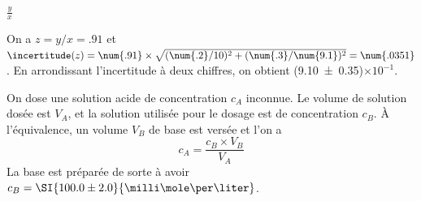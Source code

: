 

\begin{enonce}
$\frac{y}{x}$
\end{enonce}


\begin{corrige}
On a $z=y/x=\num{.91}$ et $\incertitude(z)=\num{.91}\times \sqrt{(\num{.2}/10)^2+(\num{.3}/\num{9.1})^2}=\num{.0351}$. En arrondissant l'incertitude à deux chiffres, on obtient (\num{9.10\pm.35})$\times 10^{-1}$.
\end{corrige}


\finEntrainement





\hauteurLargeurCadreReponse		{6mm}{3cm}
\initialisationEntrainement


\debutEntrainement

On dose une solution acide de concentration $c_A$ inconnue. Le volume de solution dosée est $V_A$, et la solution utilisée pour le dosage est de concentration $c_B$. À l'équivalence, un volume $V_B$ de base est versée et l'on a 
\[
  c_A=\frac{c_B\times V_B}{V_A}
\]
La base est préparée de sorte à avoir \( c_B = \SI{100.0\pm 2.0}{\milli\mole\per\liter} \). 

